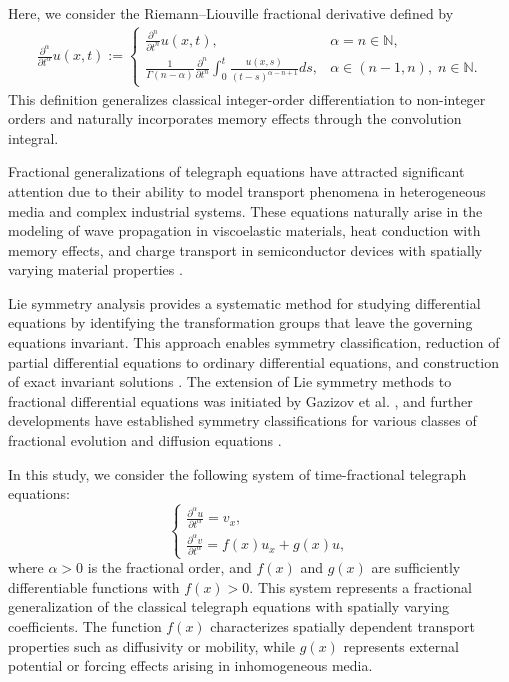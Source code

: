 \documentclass[12pt]{amsart}
\begin{document}
Here, we consider the Riemann--Liouville fractional derivative defined by
\begin{align}\label{defrld}
\frac{\partial^\alpha}{\partial t^\alpha} u(x,t)
:=
\begin{cases}
\displaystyle \frac{\partial^n}{\partial t^n} u(x,t),
& \alpha = n \in \mathbb{N}, \\[8pt]
\displaystyle \frac{1}{\Gamma(n-\alpha)}
\frac{\partial^n}{\partial t^n}
\int_0^t \frac{u(x,s)}{(t-s)^{\alpha-n+1}} ds,
& \alpha \in (n-1,n),\; n \in \mathbb{N}.
\end{cases}
\end{align}
This definition generalizes classical integer-order differentiation to non-integer orders and naturally incorporates memory effects through the convolution integral.

Fractional generalizations of telegraph equations have attracted significant attention due to their ability to model transport phenomena in heterogeneous media and complex industrial systems. These equations naturally arise in the modeling of wave propagation in viscoelastic materials, heat conduction with memory effects, and charge transport in semiconductor devices with spatially varying material properties \cite{OrsingherBeghin2004, Mainardi2010}.

Lie symmetry analysis provides a systematic method for studying differential equations by identifying the transformation groups that leave the governing equations invariant. This approach enables symmetry classification, reduction of partial differential equations to ordinary differential equations, and construction of exact invariant solutions \cite{BlumanKumei1989, Olver1993}. The extension of Lie symmetry methods to fractional differential equations was initiated by Gazizov et al. \cite{GazizovKasatkinLukashchuk2007}, and further developments have established symmetry classifications for various classes of fractional evolution and diffusion equations \cite{LukashchukMakunin2015, HuangShen2015, ourNL, Baleanu2022, Wang2023, Gurefe2023}.

In this study, we consider the following system of time-fractional telegraph equations:
\begin{equation}\label{1}
\begin{cases}
\frac{\partial^\alpha u}{\partial t^\alpha} = v_x, \\
\frac{\partial^\alpha v}{\partial t^\alpha} = f(x)u_x + g(x)u,
\end{cases}
\end{equation}
where $\alpha > 0$ is the fractional order, and $f(x)$ and $g(x)$ are sufficiently differentiable functions with $f(x) > 0$. This system represents a fractional generalization of the classical telegraph equations with spatially varying coefficients. The function $f(x)$ characterizes spatially dependent transport properties such as diffusivity or mobility, while $g(x)$ represents external potential or forcing effects arising in inhomogeneous media.
\end{document}
